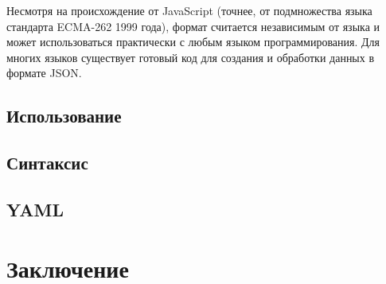 \documentclass[a4page]{article}
\begin{document}
Несмотря на происхождение от JavaScript (точнее, от подмножества языка стандарта ECMA-262 1999 \cite{ecma:262} года),
формат считается независимым от языка и может использоваться практически с любым языком программирования.
Для многих языков существует готовый код для создания и обработки данных в формате JSON.

\subsection{Использование}

\subsection{Синтаксис}

\subsection{YAML}

\newpage
\section{Заключение}

\newpage
{}
\printbibliography
\end{document}
